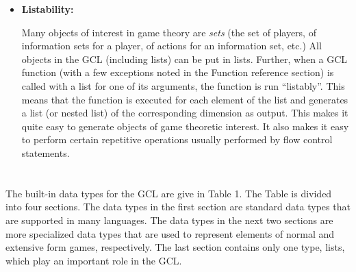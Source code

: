 \begin{itemize}
\item {\bf Listability: } 

Many objects of interest in game theory are {\it sets} (the set of
players, of information sets for a player, of actions for an
information set, etc.)  All objects in the GCL (including lists) can
be put in lists.  Further, when a GCL function (with a few exceptions
noted in the Function reference section) is called with a list for
one of its arguments, the function is run ``listably''.  This means
that the function is executed for each element of the list and
generates a list (or nested list) of the corresponding dimension as
output.  This makes it quite easy to generate objects of game
theoretic interest.  It also makes it easy to perform certain
repetitive operations usually performed by flow control statements.
\end{itemize}

\section{}

The built-in data types for the GCL are give in Table 1.  The Table is
divided into four sections. The data types in the first section are
standard data types that are supported in many languages.  The data
types in the next two sections are more specialized data types that
are used to represent elements of normal and extensive form games,
respectively.  The last section contains only one type, lists, which
play an important role in the GCL. 


